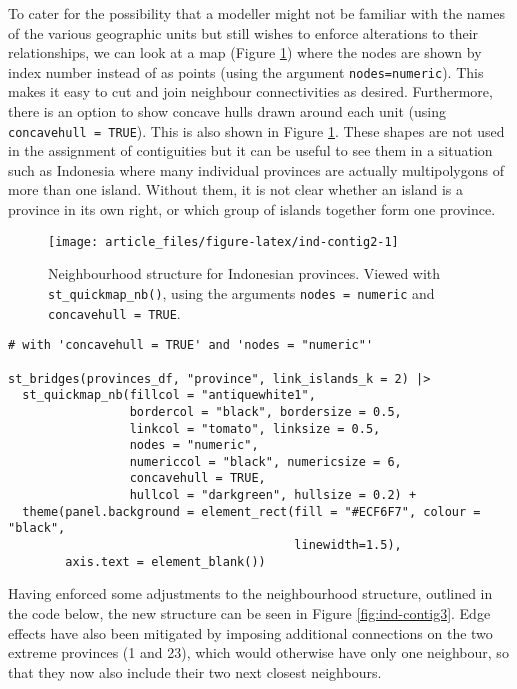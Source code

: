To cater for the possibility that a modeller might not be familiar with the names of the various geographic units but still wishes to enforce alterations to their relationships, we can look at a map (Figure \ref{fig:ind-contig2}) where the nodes are shown by
index number instead of as points (using the argument \texttt{nodes=\textquotesingle{}numeric\textquotesingle{}}). This makes it easy to cut and join neighbour connectivities as desired. Furthermore, there is an option to
show concave hulls drawn around each unit (using \texttt{concavehull\ =\ TRUE}). This is also shown in Figure \ref{fig:ind-contig2}. These shapes are not used in the assignment of contiguities but it can be useful to see them in a situation such as Indonesia where many individual provinces are actually multipolygons of more than one island. Without them, it is not clear whether an island is a province in its own right, or which group of islands together form one province.



\begin{figure}

{\centering \texttt{[image: article\_files/figure-latex/ind-contig2-1]} 

}

\caption{Neighbourhood structure for Indonesian provinces. Viewed with \texttt{st\_quickmap\_nb()}, using the arguments \texttt{nodes\ =\ \textquotesingle{}numeric\textquotesingle{}} and \texttt{concavehull\ =\ TRUE}.}\label{fig:ind-contig2}
\end{figure}

\begin{verbatim}
# with 'concavehull = TRUE' and 'nodes = "numeric"'

st_bridges(provinces_df, "province", link_islands_k = 2) |> 
  st_quickmap_nb(fillcol = "antiquewhite1", 
                 bordercol = "black", bordersize = 0.5, 
                 linkcol = "tomato", linksize = 0.5, 
                 nodes = "numeric", 
                 numericcol = "black", numericsize = 6, 
                 concavehull = TRUE, 
                 hullcol = "darkgreen", hullsize = 0.2) + 
  theme(panel.background = element_rect(fill = "#ECF6F7", colour = "black", 
                                        linewidth=1.5),
        axis.text = element_blank())
\end{verbatim}

Having enforced some adjustments to the neighbourhood structure, outlined in the code below, the
new structure can be seen in Figure \ref{fig:ind-contig3}. Edge effects
have also been mitigated by imposing additional connections on the two extreme
provinces (1 and 23), which would otherwise have only one neighbour, so that they now also include
their two next closest neighbours.



